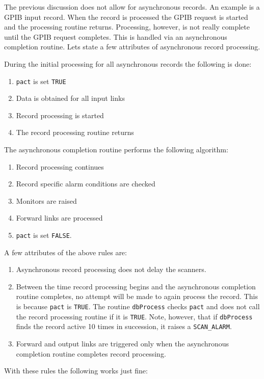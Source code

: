The previous discussion does not allow for asynchronous records. An example is a GPIB input record. When the record is 
processed the GPIB request is started and the processing routine returns. Processing, however, is not really complete until 
the GPIB request completes. This is handled via an asynchronous completion routine. Lets state a few attributes of 
asynchronous record processing. 

During the initial processing for all asynchronous records the following is done:

\begin{enumerate}\item \verb|pact| is set \verb|TRUE|

\item Data is obtained for all input links

\item Record processing is started

\item The record processing routine returns

\end{enumerate}The asynchronous completion routine performs the following algorithm:

\begin{enumerate}\item Record processing continues

\item Record specific alarm conditions are checked

\item Monitors are raised

\item Forward links are processed

\item \verb|pact| is set \verb|FALSE|.

\end{enumerate}A few attributes of the above rules are:

\begin{enumerate}\item Asynchronous record processing does not delay the scanners.

\item Between the time record processing begins and the asynchronous completion routine completes, no attempt will be 
made to again process the record. This is because \verb|pact| is \verb|TRUE|. The routine \verb|dbProcess| checks \verb|pact| and does 
not call the record processing routine if it is \verb|TRUE|. Note, however, that if \verb|dbProcess| finds the record active 10 
times in succession, it raises a \verb|SCAN_ALARM|.

\item Forward and output links are triggered only when the asynchronous completion routine completes record 
processing.

\end{enumerate}With these rules the following works just fine:


